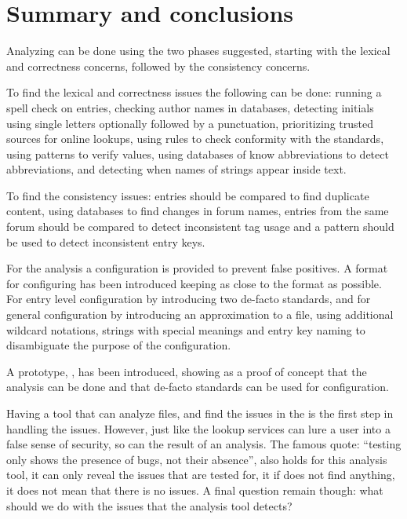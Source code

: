 \section{Summary and conclusions}

Analyzing {\bibtex} can be done using the two phases suggested,
starting with the lexical and correctness concerns, followed by the
consistency concerns.

To find the lexical and correctness issues the following can be done:
running a spell check on entries, checking author names in databases,
detecting initials using single letters optionally followed by a
punctuation, prioritizing trusted sources for online lookups, using
rules to check conformity with the standards, using patterns to verify
values, using databases of know abbreviations to detect abbreviations,
and detecting when names of strings appear inside text.

To find the consistency issues: entries should be compared to find
duplicate content, using databases to find changes in forum names,
entries from the same forum should be compared to detect inconsistent
tag usage and a pattern should be used to detect inconsistent entry
keys.

For the analysis a configuration is provided to prevent false
positives.  A format for configuring has been introduced keeping as
close to the {\bibtex} format as possible.  For entry level
configuration by introducing two de-facto standards, and for general
configuration by introducing an approximation to a {\bibtex} file,
using additional wildcard notations, strings with special meanings and
entry key naming to disambiguate the purpose of the configuration.

A prototype, {\orangutan}, has been introduced, showing as a proof of
concept that the analysis can be done and that de-facto standards can
be used for configuration.

Having a tool that can analyze {\bibtex} files, and find the issues in
the  is the first step in handling the issues.  However,
just like the lookup services can lure a user into a false sense of
security, so can the result of an analysis.  The famous quote:
``testing only shows the presence of bugs, not their absence'', also
holds for this analysis tool, it can only reveal the issues that are
tested for, it if does not find anything, it does not mean that there
is no issues.  A final question remain though: what should we do with
the issues that the analysis tool detects?
